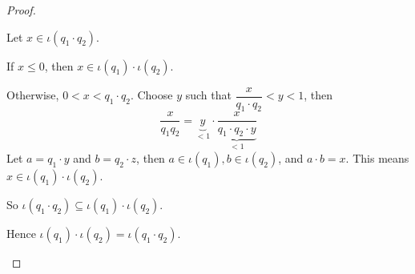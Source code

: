 \begin{proof}
\begin{itemize}
\begin{itemize}
                        Let $x\in\iota(q_{1}\cdot q_{2})$.

                        If $x\le 0$, then $x\in\iota(q_{1})\cdot\iota(q_{2})$.

                        Otherwise, $0 < x < q_{1}\cdot q_{2}$. Choose $y$ such that $\dfrac{x}{q_{1}\cdot q_{2}} < y < 1$, then
                        \[
                            \dfrac{x}{q_{1}q_{2}} = \underbrace{y}_{< 1}\cdot\underbrace{\dfrac{x}{q_{1}\cdot q_{2}\cdot y}}_{< 1}
                        \]
                        Let $a = q_{1}\cdot y$ and $b = q_{2}\cdot z$, then $a\in\iota(q_{1}), b\in\iota(q_{2})$, and $a\cdot b = x$. This means $x\in\iota(q_{1})\cdot\iota(q_{2})$.

                        So $\iota(q_{1}\cdot q_{2})\subseteq\iota(q_{1})\cdot\iota(q_{2})$.

                        Hence $\iota(q_{1})\cdot\iota(q_{2}) = \iota(q_{1}\cdot q_{2})$.


\end{itemize}
\end{itemize}
\end{proof}
